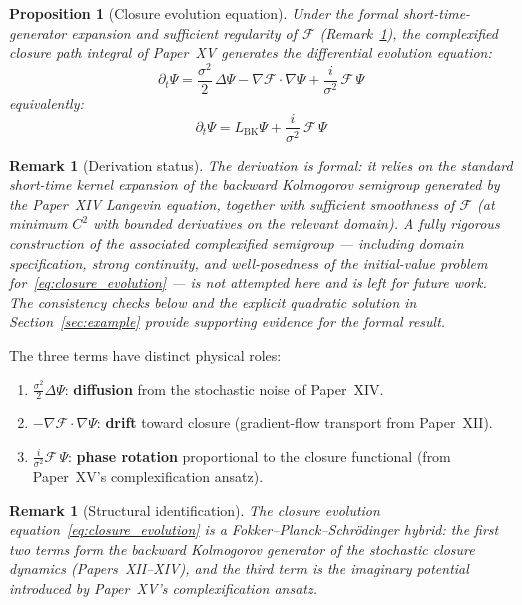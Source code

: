 \documentclass[12pt]{article}
\newtheorem{proposition}[theorem]{Proposition}
\newtheorem{remark}[theorem]{Remark}
\newcommand{\Fcal}{\mathcal{F}}
\begin{document}
\begin{proposition}[Closure evolution equation]\label{prop:evolution}
Under the formal short-time-generator expansion and sufficient regularity of $\Fcal$ (Remark~\ref{rem:derivation_status}), the complexified closure path integral of Paper~XV generates the differential evolution equation:
\begin{equation}\label{eq:closure_evolution}
    \boxed{\partial_t \Psi = \frac{\sigma^2}{2}\,\Delta\Psi - \nabla\Fcal \cdot \nabla\Psi + \frac{i}{\sigma^2}\,\Fcal\,\Psi}
\end{equation}
equivalently:
\begin{equation}
    \partial_t \Psi = L_{\mathrm{BK}}\Psi + \frac{i}{\sigma^2}\,\Fcal\,\Psi
\end{equation}
\end{proposition}

\begin{remark}[Derivation status]\label{rem:derivation_status}
The derivation is formal: it relies on the standard short-time kernel expansion of the backward Kolmogorov semigroup generated by the Paper~XIV Langevin equation, together with sufficient smoothness of $\Fcal$ (at minimum $C^2$ with bounded derivatives on the relevant domain). A fully rigorous construction of the associated complexified semigroup --- including domain specification, strong continuity, and well-posedness of the initial-value problem for~\eqref{eq:closure_evolution} --- is not attempted here and is left for future work. The consistency checks below and the explicit quadratic solution in Section~\ref{sec:example} provide supporting evidence for the formal result.
\end{remark}

The three terms have distinct physical roles:
\begin{enumerate}
    \item $\frac{\sigma^2}{2}\Delta\Psi$: \textbf{diffusion} from the stochastic noise of Paper~XIV.
    \item $-\nabla\Fcal \cdot \nabla\Psi$: \textbf{drift} toward closure (gradient-flow transport from Paper~XII).
    \item $\frac{i}{\sigma^2}\Fcal\,\Psi$: \textbf{phase rotation} proportional to the closure functional (from Paper~XV's complexification ansatz).
\end{enumerate}

\begin{remark}[Structural identification]
The closure evolution equation~\eqref{eq:closure_evolution} is a \textit{Fokker--Planck--Schr\"odinger hybrid}: the first two terms form the backward Kolmogorov generator of the stochastic closure dynamics (Papers~XII--XIV), and the third term is the imaginary potential introduced by Paper~XV's complexification ansatz.
\end{remark}
\end{document}
